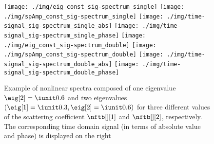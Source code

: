 
\begin{figure}[t]
  \centering
      \texttt{[image: ./img/eig\_const\_sig-spectrum\_single]}
      \texttt{[image: ./img/spAmp\_const\_sig-spectrum\_single]}
      \texttt{[image: ./img/time-signal\_sig-spectrum\_single\_abs]}
      \texttt{[image: ./img/time-signal\_sig-spectrum\_single\_phase]}
      \texttt{[image: ./img/eig\_const\_sig-spectrum\_double]}
      \texttt{[image: ./img/spAmp\_const\_sig-spectrum\_double]}
      \texttt{[image: ./img/time-signal\_sig-spectrum\_double\_abs]}
      \texttt{[image: ./img/time-signal\_sig-spectrum\_double\_phase]}
  \caption{Example of nonlinear spectra composed of  one eigenvalue $\eig[2] = \iunit0.6$ and  two eigenvalues $(\eig[1] = \iunit  0.3, \eig[2] = \iunit0.6)$ for three different values of the scattering coefficient $\nftb[][1]$ and $\nftb[][2]$, respectively. The  corresponding time domain signal (in terms of absolute value and phase) is displayed on the right}
  \label{fig:signal_spectrum_relation}
\end{figure}

